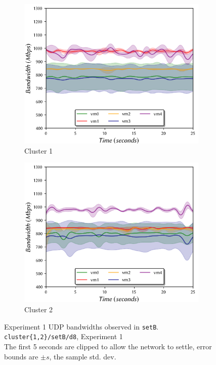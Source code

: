 \documentclass[a4paper,10pt]{article}
\begin{document}
\begin{figure}
    \centering
    \begin{subfigure}{.45\textwidth}
      \centering
      \includegraphics[width=\hsize]{figs/cluster1/setB/vis-3-2.png}
      \vspace{-4mm}
      \caption{Cluster 1}
    \end{subfigure}%
    \hfill
    \begin{subfigure}{.45\textwidth}
      \centering
      \includegraphics[width=\hsize]{figs/cluster2/setB/vis-3-2.png}
      \vspace{-5mm}
      \caption{Cluster 2}
    \end{subfigure}%
    \caption{\centering{} Experiment 1 UDP bandwidths observed in \texttt{setB}. \\ \texttt{cluster\{1,2\}/setB/d8}, Experiment 1 \\ The first 5 seconds are clipped to allow the network to settle, error bounds are $\pm s$, the sample std. dev.}
    \label{fig:temp-bw-udp}
\end{figure}
\end{document}
